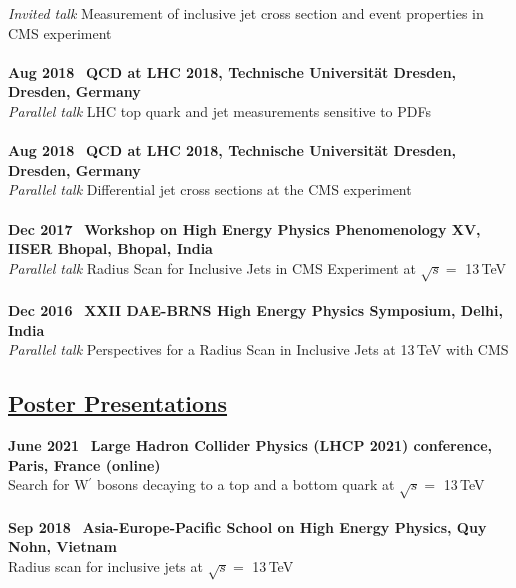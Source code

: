\documentclass[a4paper,11pt]{article}
\begin{document}
{\textit{Invited talk}\hspace{0.5cm}
Measurement of inclusive jet cross section and event properties in CMS experiment \\
\\
\textbf{Aug 2018} \ \textbf{QCD at LHC 2018, Technische Universit{\"a}t Dresden, Dresden, Germany} \\
\textit{Parallel talk}\hspace{0.5cm} 
LHC top quark and jet measurements sensitive to PDFs  \\
\\
\textbf{Aug 2018} \ \textbf{QCD at LHC 2018, Technische Universit{\"a}t Dresden, Dresden, Germany} \\
\textit{Parallel talk}\hspace{0.5cm}
Differential jet cross sections at the CMS experiment \\
\\
\textbf{Dec 2017} \ \textbf{Workshop on High Energy Physics Phenomenology XV, IISER Bhopal, Bhopal, India} \\
\textit{Parallel talk}\hspace{0.5cm}
Radius Scan for Inclusive Jets in CMS Experiment at $\sqrt{s} =$ 13\,TeV \\
\\
\textbf{Dec 2016} \ \textbf{XXII DAE-BRNS High Energy Physics Symposium, Delhi, India} \\
\textit{Parallel talk}\hspace{0.5cm}
Perspectives for a Radius Scan in Inclusive Jets at 13\,TeV with CMS  \\

\subsection*{\underline{Poster Presentations}}

\textbf{June 2021} \ \textbf{Large Hadron Collider Physics (LHCP 2021) conference, Paris, France (online)}\\
Search for W$^{\prime}$ bosons decaying to a top and a bottom quark at $\sqrt{s}=$ 13\,TeV\\
\\
\textbf{Sep 2018} \ \textbf{Asia-Europe-Pacific School on High Energy Physics, Quy Nohn, Vietnam}\\
Radius scan for inclusive jets at $\sqrt{s}=$ 13\,TeV\\

}
\end{document}
